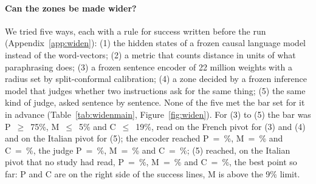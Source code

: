 \paragraph{Can the zones be made wider?} We tried five ways, each with a rule for success written
before the run (Appendix~\ref{app:widen}): (1) the hidden states of a frozen causal language model
instead of the word-vectors; (2) a metric that counts distance in units of what paraphrasing does;
(3) a frozen sentence encoder of 22 million weights \citep{reimers2019sbert,wang2020minilm} with
a radius set by split-conformal calibration; (4) a zone decided by a frozen inference model
\citep{he2023debertav3} that judges whether two instructions ask for the same thing; (5) the same kind of judge, asked sentence by sentence. None of the five met the bar set for it in advance
(Table~\ref{tab:widenmain}, Figure~\ref{fig:widen}). For (3) to (5) the bar was \textsf{P}~$\ge$~75\%, \textsf{M}~$\le$~5\% and \textsf{C}~$\le$~19\%, read on the French pivot for (3) and (4) and on the Italian pivot for (5); the encoder reached \textsf{P}~=~\WidenEncPrimP{}\%,
\textsf{M}~=~\WidenEncPrimM{}\% and \textsf{C}~=~\WidenEncPrimC{}\%, the judge \textsf{P}~=~\WidenJudgeFrP{}\%,
\textsf{M}~=~\WidenJudgeFrM{}\% and \textsf{C}~=~\WidenJudgeC{}\%; (5) reached, on the Italian pivot that no study had read, \textsf{P}~=~\WidenSentItP{}\%, \textsf{M}~=~\WidenSentItM{}\% and \textsf{C}~=~\WidenSentC{}\%, the best point so far: \textsf{P} and \textsf{C} are on the right side of the success lines, \textsf{M} is above the 9\% limit.

